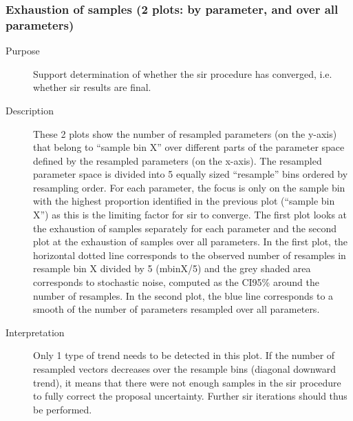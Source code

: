 \subsubsection{Exhaustion of samples (2 plots: by parameter, and over all parameters)}
\begin{description}
\item[Purpose] Support determination of whether the sir procedure has converged, i.e. whether sir results are final.
\item[Description] These 2 plots show the number of resampled parameters (on the y-axis) that belong to “sample bin X” over different parts of the parameter space defined by the resampled parameters (on the x-axis). The resampled parameter space is divided into 5 equally sized “resample” bins ordered by resampling order. For each parameter, the focus is only on the sample bin with the highest proportion identified in the previous plot (“sample bin X”) as this is the limiting factor for sir to converge. The first plot looks at the exhaustion of samples separately for each parameter and the second plot at the exhaustion of samples over all parameters. In the first plot, the horizontal dotted line corresponds to the observed number of resamples in resample bin X divided by 5 (mbinX/5) and the grey shaded area corresponds to stochastic noise, computed as the CI95\% around the number of resamples. In the second plot, the blue line corresponds to a smooth of the number of parameters resampled over all parameters.
\item[Interpretation] Only 1 type of trend needs to be detected in this plot. If the number of resampled vectors decreases over the resample bins (diagonal downward trend), it means that there were not enough samples in the sir procedure to fully correct the proposal uncertainty. Further sir iterations should thus be performed.
\end{description}

